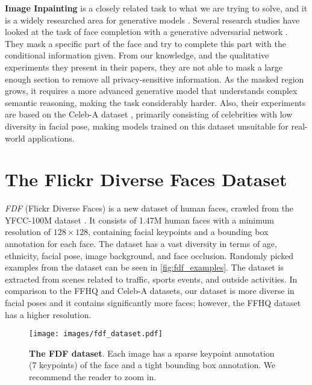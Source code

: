 \documentclass[runningheads]{llncs}
\begin{document}
\textbf{Image Inpainting} is a closely related task to what we are trying to solve, and it is a widely researched area for generative models \cite{Jo2019SC-FEGAN:Color,Li2017,Liu2018,Yeh2017}.
Several research studies have looked at the task of face completion with a generative adversarial network \cite{Li2017,Yeh2017}. They mask a specific part of the face and try to complete this part with the conditional information given.
From our knowledge, and the qualitative experiments they present in their papers, they are not able to mask a large enough section to remove all privacy-sensitive information. As the masked region grows, it requires a more advanced generative model that understands complex semantic reasoning, making the task considerably harder. 
Also, their experiments are based on the Celeb-A dataset \cite{Liu2018}, primarily consisting of celebrities with low diversity in facial pose, making models trained on this dataset unsuitable for real-world applications. 














 \section{The Flickr Diverse Faces Dataset}



\textit{FDF} (Flickr Diverse Faces) is a new dataset of human faces, crawled from the YFCC-100M dataset \cite{Thomee2015YFCC100M:Research}. It consists of 1.47M human faces with a minimum resolution of $128 \times 128$, containing facial keypoints and a bounding box annotation for each face. The dataset has a vast diversity in terms of age, ethnicity, facial pose, image background, and face occlusion. 
Randomly picked examples from the dataset can be seen in \autoref{fig:fdf_examples}.
The dataset is extracted from scenes related to traffic, sports events, and outside activities.
In comparison to the FFHQ \cite{Karras2018ANetworks} and Celeb-A \cite{Liu2018} datasets, our dataset is more diverse in facial poses and it contains significantly more faces; however, the FFHQ dataset has a higher resolution.

\begin{figure}	
	\centering
	\texttt{[image: images/fdf\_dataset.pdf]}
	\caption[Flickr Diverse Datset Examples]{\textbf{The FDF dataset}. Each image has a sparse keypoint annotation (7 keypoints) of the face and a tight bounding box annotation. We recommend the reader to zoom in.}
	\label{fig:fdf_examples}
\end{figure}
\end{document}
